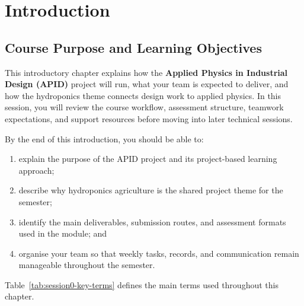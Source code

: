 \chapter{Introduction}

\section{Course Purpose and Learning Objectives}

This introductory chapter explains how the \textbf{Applied Physics in Industrial Design (APID)} project will run, what your team is expected to deliver, and how the hydroponics theme connects design work to applied physics. In this session, you will review the course workflow, assessment structure, teamwork expectations, and support resources before moving into later technical sessions.

By the end of this introduction, you should be able to:
\begin{enumerate}
    \item explain the purpose of the APID project and its project-based learning approach;
    \item describe why hydroponics agriculture is the shared project theme for the semester;
    \item identify the main deliverables, submission routes, and assessment formats used in the module; and
    \item organise your team so that weekly tasks, records, and communication remain manageable throughout the semester.
\end{enumerate}

Table~\ref{tab:session0-key-terms} defines the main terms used throughout this chapter.

